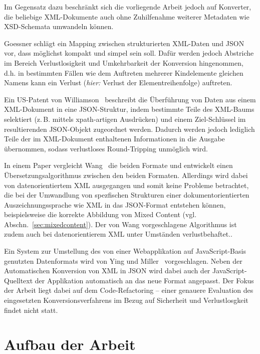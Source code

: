 Im Gegensatz dazu beschränkt sich die vorliegende Arbeit jedoch auf Konverter, die beliebige XML-Dokumente auch ohne Zuhilfenahme weiterer Metadaten wie XSD-Schemata umwandeln können.

Goessner schlägt ein Mapping zwischen strukturierten XML-Daten und JSON vor, dass möglichst kompakt und simpel sein soll. Dafür werden jedoch Abstriche im Bereich Verlustlosigkeit und Umkehrbarkeit der Konversion hingenommen, d.h. in bestimmten Fällen wie dem Auftreten mehrerer Kindelemente gleichen Namens kann ein Verlust (\emph{hier:} Verlust der Elementreihenfolge) auftreten.~\cite{goessner2006converting}

Ein US-Patent von Williamson~\cite{US20140244692} beschreibt die Überführung von Daten aus einem XML-Dokument in eine JSON-Struktur, indem bestimmte Teile des XML-Baums selektiert (z.\,B. mittels \acrshort{xpath}-artigen Ausdrücken) und einem Ziel-Schlüssel im resultierenden JSON-Objekt zugeordnet werden. Dadurch werden jedoch lediglich Teile der im XML-Dokument enthaltenen Informationen in die Ausgabe übernommen, sodass verlustloses Round-Tripping unmöglich wird.

In einem Paper vergleicht Wang~\cite{wang2011improving} die beiden Formate und entwickelt einen Übersetzungsalgorithmus zwischen den beiden Formaten. Allerdings wird dabei von datenorientiertem XML ausgegangen und somit keine Probleme betrachtet, die bei der Umwandlung von spezfischen Strukturen einer dokumentorientierten Auszeichnungssprache wie XML in das JSON-Format entstehen können, beispielsweise die korrekte Abbildung von Mixed Content (vgl. Abschn.~\ref{sec:mixedcontent}). Der von Wang vorgeschlagene Algorithmus ist zudem auch bei datenorientierem XML unter Umständen verlustbehaftet.\cite[S.~184]{wang2011improving}.

Ein System zur Umstellung des von einer Webapplikation auf JavaScript-Basis genutzten Datenformats wird von Ying und Miller~\cite{ying2013refactoring} vorgeschlagen. Neben der Automatischen Konversion von XML in JSON wird dabei auch der JavaScript-Quelltext der Applikation automatisch an das neue Format angepasst. Der Fokus der Arbeit liegt dabei auf dem Code-Refactoring -- einer genauere Evaluation des eingesetzten Konversionsverfahrens im Bezug auf Sicherheit und Verlustlosgkeit findet nicht statt.

\section{Aufbau der Arbeit}
\label{sec:structure}

